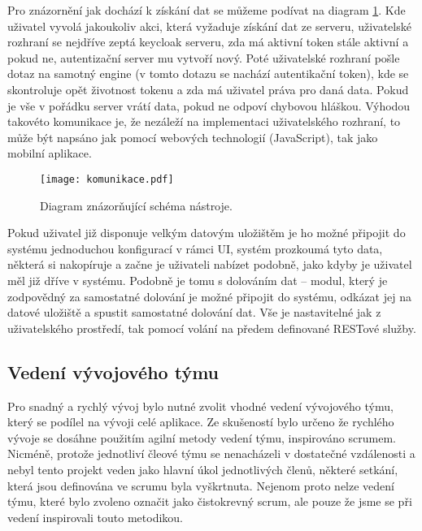 \par Pro znázornění jak dochází k získání dat se můžeme podívat na diagram \ref{komunikace}. Kde uživatel vyvolá jakoukoliv akci, která vyžaduje získání dat ze serveru, uživatelské rozhraní se nejdříve zeptá keycloak serveru, zda má aktivní token stále aktivní a pokud ne, autentizační server mu vytvoří nový. Poté uživatelské rozhraní pošle dotaz na samotný engine (v tomto dotazu se nachází autentikační token), kde se skontroluje opět životnost tokenu a zda má uživatel práva pro daná data. Pokud je vše v pořádku server vrátí data, pokud ne odpoví chybovou hláškou. Výhodou takovéto komunikace je, že nezáleží na implementaci uživatelského rozhraní, to může být napsáno jak pomocí webových technologií (JavaScript), tak jako mobilní aplikace.

\begin{figure}[htp]
  \centering
  \texttt{[image: komunikace.pdf]}
  \caption{Diagram znázorňující schéma nástroje.}
  \label{komunikace}
\end{figure}

\par Pokud uživatel již disponuje velkým datovým uložištěm je ho možné připojit do systému jednoduchou konfigurací v rámci UI, systém prozkoumá tyto data, některá si nakopíruje a začne je uživateli nabízet podobně, jako kdyby je uživatel měl již dříve v systému. Podobně je tomu s dolováním dat -- modul, který je zodpovědný za samostatné dolování je možné připojit do systému, odkázat jej na datové uložiště a spustit samostatné dolování dat. Vše je nastavitelné jak z uživatelského prostředí, tak pomocí volání na předem definované RESTové služby.

\subsection{Vedení vývojového týmu}
\par Pro snadný a rychlý vývoj bylo nutné zvolit vhodné vedení vývojového týmu, který se podílel na vývoji celé aplikace. Ze skušeností bylo určeno že rychlého vývoje se dosáhne použitím agilní metody vedení týmu, inspirováno scrumem. Nicméně, protože jednotliví čleové týmu se nenacházeli v dostatečné vzdálenosti a nebyl tento projekt veden jako hlavní úkol jednotlivých členů, některé setkání, která jsou definována ve scrumu byla vyškrtnuta. Nejenom proto nelze vedení týmu, které bylo zvoleno označit jako čistokrevný scrum, ale pouze že jsme se při vedení inspirovali touto metodikou.

